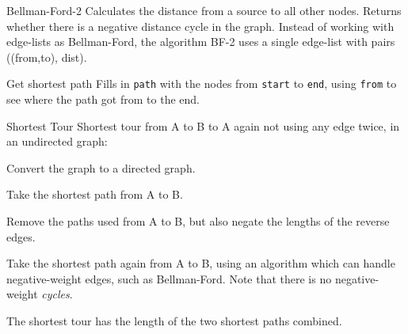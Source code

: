 \begin{algorithm}{Bellman-Ford-2}
\desc
Calculates the distance from a source to all other nodes.
Returns whether there is a negative distance cycle in the graph.
Instead of working with edge-lists as Bellman-Ford, the algorithm BF-2 uses
a single edge-list with pairs ((from,to), dist).
\end{algorithm}

\begin{algorithm}{Get shortest path}
\desc
Fills in {\tt path} with the nodes from {\tt start} to {\tt end}, using
{\tt from} to see where the path got from to the end.
\end{algorithm}


\begin{algorithm}{Shortest Tour}
\desc
Shortest tour from A to B to A again not using any edge twice, in an
undirected graph:

Convert the graph to a directed graph.

Take the shortest path from A to B.

Remove the paths used from A to B, but also negate the lengths of the
reverse edges.

Take the shortest path again from A to B, using an algorithm which can handle
negative-weight edges, such as Bellman-Ford. Note that there is no
negative-weight \emph{cycles}.

The shortest tour has the length of the two shortest paths combined.
\end{algorithm}
